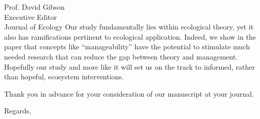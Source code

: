 \documentclass[12pt]{letter}
\begin{document}
\begin{letter}{
       Prof. David Gibson\\
       Executive Editor\\
       Journal of Ecology}
Our study fundamentally lies within ecological theory, yet it also has ramifications pertinent to ecological application. 
Indeed, we show in the paper that concepts like ``manageability'' have the potential to stimulate much needed research that can reduce the gap between theory and management.
Hopefully our study and more like it will set us on the track to informed, rather than hopeful, ecosystem interventions. 

Thank you in advance for your consideration of our manuscript at your journal.

\closing{Regards,}

\end{letter}
\end{document}
